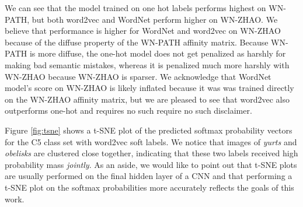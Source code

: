 We can see that the model trained on one hot labels performs highest on WN-PATH,
but both word2vec and WordNet perform higher on WN-ZHAO. We believe that
performance is higher for WordNet and word2vec on WN-ZHAO because of the diffuse
property of the WN-PATH affinity matrix. Because WN-PATH is more diffuse, the
one-hot model does not get penalized as harshly for making bad semantic
mistakes, whereas it is penalized much more harshly with WN-ZHAO because WN-ZHAO
is sparser.  We acknowledge that WordNet model's score on WN-ZHAO is likely
inflated because it was was trained directly on the WN-ZHAO affinity matrix, but
we are pleased to see that word2vec also outperforms one-hot and requires no
such require no such disclaimer.

Figure \ref{fig:tsne} shows a t-SNE plot of the predicted softmax probability
vectors for the C5 class set with word2vec soft labels. We notice that images of
\emph{yurts} and \emph{obelisks} are clustered close together, indicating that
these two labels received high probability mass \emph{jointly}. As an aside, we
would like to point out that t-SNE plots are usually performed on the final
hidden layer of a CNN and that performing a t-SNE plot on the softmax
probabilities more accurately reflects the goals of this work.



%

